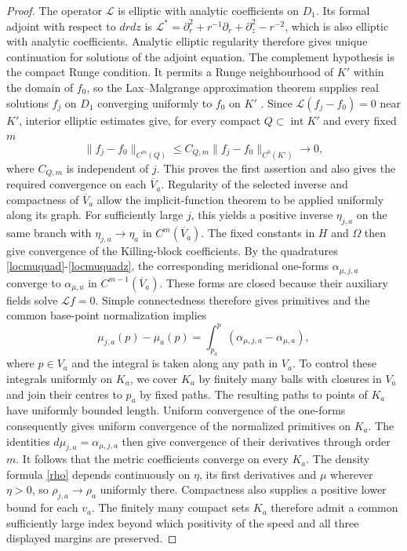\documentclass[amsmath,amsfonts,amssymb,aps,pra,superscriptaddress,10pt]{revtex4-2}
\numberwithin{equation}{section}
\theoremstyle{plain}
\theoremstyle{definition}
\theoremstyle{remark}
\theoremstyle{definition}
\begin{document}
\begin{proof}
The operator $\mathcal{L}$ is elliptic with analytic coefficients on $D_1$. Its formal adjoint with respect to $drdz$ is $\mathcal{L}^*=\partial_r^2+r^{-1}\partial_r+\partial_z^2-r^{-2}$, which is also elliptic with analytic coefficients. Analytic elliptic regularity therefore gives unique continuation for solutions of the adjoint equation. The complement hypothesis is the compact Runge condition. It permits a Runge neighbourhood of $K'$ within the domain of $f_0$, so the Lax--Malgrange approximation theorem supplies real solutions $f_j$ on $D_1$ converging uniformly to $f_0$ on $K'$ \cite{Malgrange1956AIF}. Since $\mathcal{L}(f_j-f_0)=0$ near $K'$, interior elliptic estimates give, for every compact $Q\subset\operatorname{int}K'$ and every fixed $m$
\begin{equation}
\|f_j-f_0\|_{C^m(Q)}\leq C_{Q,m}\|f_j-f_0\|_{C^0(K')}\longrightarrow 0,
\end{equation}
where $C_{Q,m}$ is independent of $j$. This proves the first assertion and also gives the required convergence on each $\overline{V}_a$. Regularity of the selected inverse and compactness of $\overline{V}_a$ allow the implicit-function theorem to be applied uniformly along its graph. For sufficiently large $j$, this yields a positive inverse $\eta_{j,a}$ on the same branch with $\eta_{j,a}\to\eta_a$ in $C^m(\overline{V}_a)$. The fixed constants in $H$ and $\Omega$ then give convergence of the Killing-block coefficients. By the quadratures \eqref{locmuquad}-\eqref{locmuquadz}, the corresponding meridional one-forms $\alpha_{\mu,j,a}$ converge to $\alpha_{\mu,a}$ in $C^{m-1}(\overline{V}_a)$. These forms are closed because their auxiliary fields solve $\mathcal{L}f=0$. Simple connectedness therefore gives primitives and the common base-point normalization implies
\begin{equation}
\mu_{j,a}(p)-\mu_a(p)=\int_{p_a}^{p}\left(\alpha_{\mu,j,a}-\alpha_{\mu,a}\right),
\end{equation}
where $p\in V_a$ and the integral is taken along any path in $V_a$. To control these integrals uniformly on $K_a$, we cover $K_a$ by finitely many balls with closures in $V_a$ and join their centres to $p_a$ by fixed paths. The resulting paths to points of $K_a$ have uniformly bounded length. Uniform convergence of the one-forms consequently gives uniform convergence of the normalized primitives on $K_a$. The identities $d\mu_{j,a}=\alpha_{\mu,j,a}$ then give convergence of their derivatives through order $m$. It follows that the metric coefficients converge on every $K_a$. The density formula \eqref{rho} depends continuously on $\eta$, its first derivatives and $\mu$ wherever $\eta>0$, so $\rho_{j,a}\to\rho_a$ uniformly there. Compactness also supplies a positive lower bound for each $v_a$. The finitely many compact sets $K_a$ therefore admit a common sufficiently large index beyond which positivity of the speed and all three displayed margins are preserved.
\end{proof}
\end{document}

